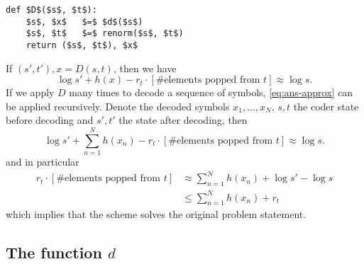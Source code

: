 \documentclass{article}
\begin{document}
\begin{lstlisting}
def $D$($s$, $t$):
    $s$, $x$   $=$ $d$($s$)
    $s$, $t$   $=$ renorm($s$, $t$)
    return ($s$, $t$), $x$
\end{lstlisting}
If $(s', t'), x = D(s, t)$, then we have
\begin{equation}\label{eq:ans-approx}
        \log s' + h(x) - r_t\cdot\left[\text{\# elements popped from $t$}\right]
        \approx \log s.
\end{equation}
If we apply $D$ many times to decode a sequence of symbols,
\cref{eq:ans-approx} can be applied recursively. Denote the decoded symbols
$x_1, \ldots, x_N$, $s, t$ the coder state before decoding and $s', t'$ the
state after decoding, then
\begin{equation}
        \log s' + \sum_{n=1}^Nh(x_n) - r_t\cdot\left[\text{\# elements popped
        from $t$}\right] \approx \log s.
\end{equation}
and in particular
\begin{align}
         r_t\cdot\left[\text{\# elements popped
         from $t$}\right] &\approx \sum_{n=1}^Nh(x_n) + \log s' - \log s\\
                          &\leq \sum_{n=1}^Nh(x_n) + r_t
\end{align}
which implies that the scheme solves the original problem statement.
\subsection{The function $d$}\label{sec:inner-decoder}
\printbibliography
\end{document}

